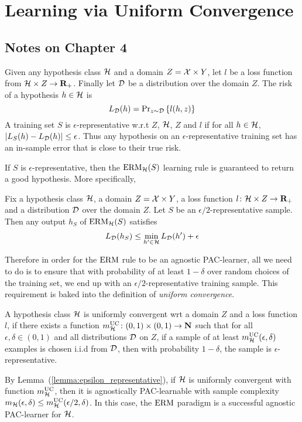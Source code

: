 \chapter{Learning via Uniform Convergence}

\section*{Notes on Chapter 4}

Given any hypothesis class $\mathcal{H}$ and a domain $Z = \mathcal{X} \times Y$, let
$l$ be a loss function from $\mathcal{H} \times Z \rightarrow \mathbf{R}_{+}$. Finally let
$\mathcal{D}$ be a distribution over the domain $Z$. The risk of a hypothesis $h \in
\mathcal{H}$ is
\[
    L_{\mathcal{D}}(h) = \text{Pr}_{z \sim \mathcal{D}} \left \{ l(h, z) \right \}
\]
A training set $S$ is $\epsilon$-representative w.r.t $Z$, $\mathcal{H}$, $Z$ and
$l$ if for all $h \in \mathcal{H}$, $|L_S (h) - L_{\mathcal{D}} (h)| \leq \epsilon$.
Thus any hypothesis on an $\epsilon$-representative training set has an
in-sample error that is close to their true risk. 

If $S$ is $\epsilon$-representative, then the $\operatorname{ERM}_{\mathcal{H}}(S)$ learning
rule is guaranteed to return a good hypothesis. More specifically,
\begin{lemma}
\label{lemma:epsilon_representative}
Fix a hypothesis class $\mathcal{H}$, a domain $Z = \mathcal{X} \times Y$, a loss 
function $l \colon \mathcal{H} \times Z \rightarrow \mathbf{R}_{+}$ and a distribution
$\mathcal{D}$ over the domain $Z$. Let $S$ be an $\epsilon/2$-representative sample. 
Then any output $h_S$ of $\operatorname{ERM}_{\mathcal{H}}(S)$ satisfies 
\[
    L_{\mathcal{D}} (h_S) \leq \min_{h' \in \mathcal{H}} L_{\mathcal{D}}(h') + \epsilon 
\]
\end{lemma}

Therefore in order for the $\operatorname{ERM}$ rule to be an agnostic PAC-learner, all we
need to do is to ensure that with probability of at least $1 - \delta$ over
random choices of the training set, we end up with an
$\epsilon/2$-representative training sample. This requirement is baked into 
the definition of \emph{uniform convergence}. 

\begin{definition}
A hypothesis class $\mathcal{H}$ is uniformly convergent wrt a domain $Z$ 
and a loss function $l$, if there exists a function 
$m_{\mathcal{H}}^{\text{UC}} \colon (0, 1) \times (0, 1) \rightarrow \mathbf{N}$ such that 
for all $\epsilon, \delta \in (0, 1)$ and all distributions $\mathcal{D}$ on $Z$,
if a sample of at least $m_{\mathcal{H}}^{\text{UC}}(\epsilon, \delta)$ examples is chosen
i.i.d from $\mathcal{D}$, then with probability $1 - \delta$, the sample is 
$\epsilon$-representative.   
\end{definition}

By Lemma~(\ref{lemma:epsilon_representative}), if $\mathcal{H}$ is uniformly convergent
with function $m_{\mathcal{H}}^{\text{UC}}$, then it is agnostically PAC-learnable with sample 
complexity $m_{\mathcal{H}}(\epsilon, \delta) \leq m_{\mathcal{H}}^{\text{UC}}(\epsilon / 2, \delta)$. In 
this case, the $\operatorname{ERM}$ paradigm is a successful agnostic PAC-learner for $\mathcal{H}$.
 
